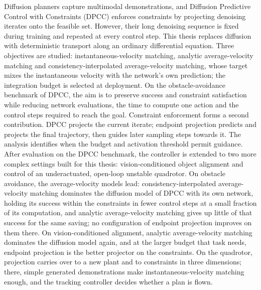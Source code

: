 \ifstandalone
Diffusion planners capture multimodal demonstrations, and Diffusion Predictive Control with
Constraints (DPCC) enforces constraints by projecting denoising iterates onto the feasible set.
However, their long denoising sequence is fixed during training and repeated at every control step.
This thesis replaces diffusion with deterministic transport along an ordinary differential equation.
Three objectives are studied: instantaneous-velocity matching, analytic average-velocity matching and
consistency-interpolated average-velocity matching, whose target mixes the instantaneous velocity with
the network's own prediction; the integration budget is selected at deployment. On the
obstacle-avoidance benchmark of DPCC, the aim is to preserve success and
constraint satisfaction while reducing network evaluations, the time to compute one action and the
control steps required to reach the goal. Constraint enforcement forms a second contribution. DPCC projects the
current iterate; endpoint projection predicts and projects the final trajectory,
then guides later sampling steps towards it. The analysis identifies when the budget and activation threshold permit guidance. After evaluation on the DPCC benchmark, the controller is extended to two
more complex settings built for this thesis: vision-conditioned object alignment and control of an
underactuated, open-loop unstable quadrotor. On obstacle avoidance, the average-velocity models lead:
consistency-interpolated average-velocity matching dominates the diffusion model of DPCC with its own
network, holding its success within the constraints in fewer control steps at a small fraction of its
computation, and analytic average-velocity matching gives up little of that success for the same
saving; no configuration of endpoint projection improves on them there. On vision-conditioned
alignment, analytic average-velocity matching dominates the diffusion model again, and at the larger
budget that task needs, endpoint projection is the better projector on the constraints. On the
quadrotor, projection carries over to a new plant and to constraints in three dimensions; there,
simple generated demonstrations make instantaneous-velocity matching enough, and the tracking
controller decides whether a plan is flown.
\fi
{}

\tableofcontents{}

\mainmatter{}

